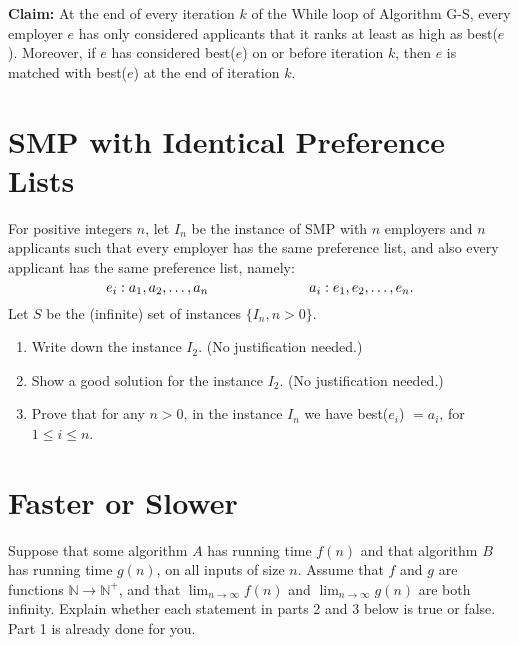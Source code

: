 \documentclass[11pt]{article}
\begin{document}
\vspace{.1in}

\noindent \textbf{Claim:} At the end of every iteration $k$ of the
While loop of Algorithm G-S, every employer $e$ has only considered
applicants that it ranks at least as high as best($e$).  Moreover, if
$e$ has considered best($e$) on or before iteration $k$, then $e$ is
matched with best($e$) at the end of iteration $k$.

\section{SMP with Identical Preference Lists}
\label{sec-3}
For positive integers $n$, let $I_n$ be the instance of SMP with $n$
employers and $n$ applicants such that every employer has the same
preference list, and also every applicant has the same preference list, namely:
\[
e_i: a_1, a_2, \ldots, a_n  \mbox{\hspace{1in}}
a_i: e_1, e_2, \ldots, e_n.
\]
Let $S$ be the (infinite) set of instances $\{I_n, n>0\}$.

\begin{enumerate}
\item Write down the instance $I_2$. (No justification needed.)

\item Show a good solution for the instance $I_2$. (No justification needed.)

\item Prove that for any $n>0$, in the instance $I_n$ we have best($e_i$) $= a_i$,
for $1 \le i \le n$.
\end{enumerate}

\section{Faster or Slower}
\label{sec-4}
Suppose that some algorithm $A$ has running time $f(n)$ and that
algorithm $B$ has running time $g(n)$, on all inputs of size $n$.
Assume that $f$ and $g$ are functions $\mathbb{N} \rightarrow \mathbb{N}^+$, and that
$\lim_{n \rightarrow \infty} f(n)$ and $\lim_{n \rightarrow \infty} g(n)$ are both infinity.
Explain whether each statement in parts 2 and 3 below is true or false.
Part 1 is already done for you.
\end{document}
